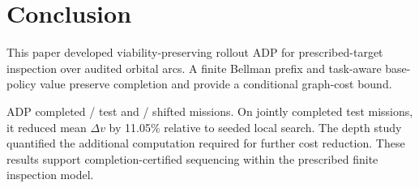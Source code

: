 \section{Conclusion}
\label{sec:conclusion}

This paper developed viability-preserving rollout ADP for prescribed-target inspection over audited orbital arcs. A finite Bellman prefix and task-aware base-policy value preserve completion and provide a conditional graph-cost bound.

ADP completed \RTTestSuccess/\RTTestN{} test and \RTOodSuccess/\RTOodN{} shifted missions. On jointly completed test missions, it reduced mean $\Delta v$ by 11.05\% relative to seeded local search. The depth study quantified the additional computation required for further cost reduction. These results support completion-certified sequencing within the prescribed finite inspection model.



